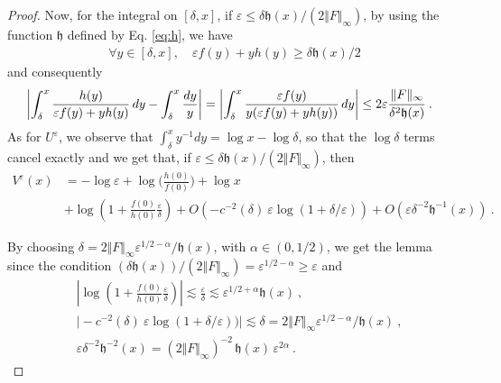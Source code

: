 \documentclass[reqno, 12pt, a4paper]{amsart}
\theoremstyle{plain}
\theoremstyle{definition}
\begin{document}
\begin{proof}
Now, for the integral on $[\delta, x]$,  if $\varepsilon \le \delta {\mathfrak h}(x)/ (2 \Vert F \Vert_{\infty})$, by using the function $\mathfrak h$ defined by Eq. \eqref{eq:h}, we have
\begin{equation}
\begin{split}
\forall y \in [\delta, x], \quad \varepsilon f(y)+yh(y) \ge \delta {\mathfrak h}(x) /2 
\end{split}
\end{equation}
and consequently 
\begin{equation}
\begin{split}
&\left\vert \int_{\delta}^x  \frac{h(y)}{\varepsilon f(y) +y h(y)}\, dy  - \int_\delta^x \frac{dy}{y}    \right\vert =\left\vert \int_{\delta}^x  \frac{\varepsilon f(y)}{ y (\varepsilon f(y) +y h(y))} \, dy    \right\vert \le 2 \varepsilon \cfrac{ \Vert F\Vert_{\infty}}{\delta^2 {\mathfrak h} (x)}  \ .
\end{split}
\end{equation}
As for $U^\varepsilon$, we observe that $\int_{\delta}^x y^{-1} dy =\log x -\log \delta$, so that the $\log \delta$ terms cancel exactly and we get that, if $\varepsilon \le \delta {\mathfrak h}(x)/ (2 \Vert F \Vert_{\infty})$, then 
\begin{equation}
\begin{split}
V^\varepsilon(x) &= - \log \varepsilon +  \log \Big(\frac{h(0)}{f(0)} \Big)  +  \log x \\
&+ \log \left( 1+ \frac{f(0)}{h(0)} \frac{\varepsilon}{\delta} \right)  +   O (- c^{-2} (\delta) \  \varepsilon \log (1+ \delta/\varepsilon)) + O( \varepsilon \delta^{-2} {\mathfrak h}^{-1} (x)) \ .
\end{split}
\end{equation}

By choosing $\delta = 2 \Vert F \Vert_{\infty}  \varepsilon^{1/2-\alpha}/ {\mathfrak h}(x)$, with $\alpha \in (0,1/2)$, we get the lemma since the condition $(\delta {\mathfrak h}(x))/(2\Vert F \Vert_{\infty})= \varepsilon^{1/2- \alpha} \ge \varepsilon$ and
\begin{equation}
\begin{split}
&\left\vert \log \left( 1+ \frac{f(0)}{h(0)} \frac{\varepsilon}{\delta} \right) \right\vert \lesssim \frac{\varepsilon}{\delta} \lesssim \varepsilon^{1/2+\alpha} {\mathfrak h}(x) \ , \\
& \vert - c^{-2} (\delta) \  \varepsilon \log (1+ \delta/\varepsilon)) \vert  \lesssim \delta =2 \Vert F \Vert_{\infty}  \varepsilon^{1/2-\alpha}/ {\mathfrak h}(x) \ , \\
&\varepsilon \delta^{-2} {\mathfrak h}^{-2} (x) = (2 \Vert F \Vert_{\infty})^{-2} \, {\mathfrak h}(x) \, \varepsilon^{2\alpha} \ .
\end{split}
\end{equation}

\end{proof}
\end{document}

